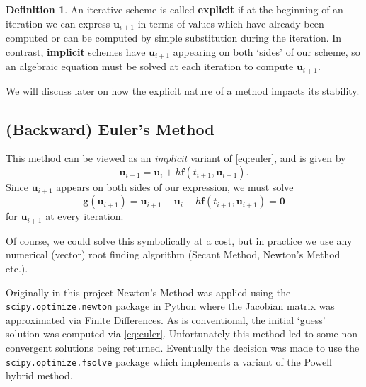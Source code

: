 \documentclass[12pt, twoside]{report}
\theoremstyle{plain}
\theoremstyle{definition}
\newtheorem{definition}{Definition}[chapter]
\theoremstyle{definition}
\begin{document}
            \begin{definition}
                An iterative scheme is called \textbf{explicit} if at the 
                beginning of an iteration we can express $\mathbf{u}_{i+1}$ in 
                terms of values which have already been computed or can be 
                computed by simple substitution during the iteration. In 
                contrast, \textbf{implicit} schemes have $\mathbf{u}_{i+1}$ 
                appearing on both `sides' of our scheme, so an algebraic 
                equation must be solved at each iteration to compute 
                $\mathbf{u}_{i+1}$.
            \end{definition}

            We will discuss later on how the explicit nature of a method 
            impacts its stability.

        \subsection{(Backward) Euler's Method}
        \label{2_backward_euler}
            This method can be viewed as an \textit{implicit} variant of 
            \eqref{eq:euler}, and is given by
            \begin{equation}
            \label{eq:backward_euler}
                \mathbf{u}_{i+1} = \mathbf{u}_i + h\mathbf{f}(t_{i+1}, 
                \mathbf{u}_{i+1}).
            \end{equation} 
            Since $\mathbf{u}_{i+1}$ appears on both sides of our expression,
            we must solve
            \begin{equation}
            \label{eq:nonlinear_equation}
                \mathbf{g}(\mathbf{u}_{i+1}) = \mathbf{u}_{i+1} - 
                \mathbf{u}_i - h\mathbf{f}(t_{i+1}, \mathbf{u}_{i+1}) 
                = \mathbf{0}
            \end{equation}
            for $\mathbf{u}_{i+1}$ at every iteration.

            Of course, we could solve this symbolically at a cost, but in
            practice we use any numerical (vector) root finding algorithm 
            (Secant Method, Newton's Method etc.). 

            Originally in this project Newton's Method was applied using the 
            \texttt{scipy.optimize.newton} package in Python where 
            the Jacobian matrix was approximated via Finite Differences. As is 
            conventional, the initial `guess' solution was computed via 
            \eqref{eq:euler}. Unfortunately this method led to some 
            non-convergent solutions being returned. Eventually the decision 
            was made to use the \texttt{scipy.optimize.fsolve} 
            package which implements a variant of the Powell hybrid method.
\end{document}
